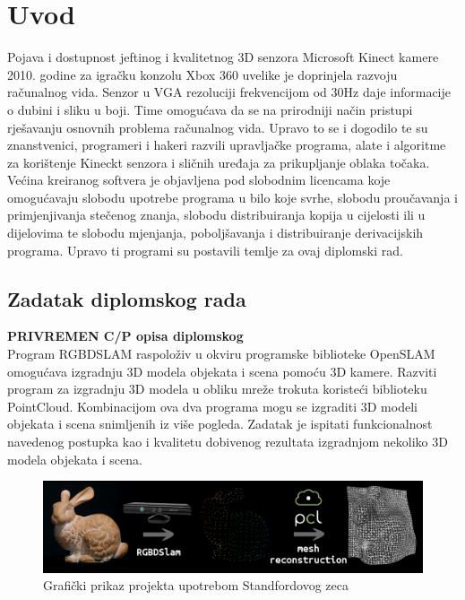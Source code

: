 \newpage

\setcounter{page}{1}
\setcounter{figure}{0}
\section{Uvod}%
\label{sec:Uvod}


Pojava i dostupnost jeftinog i kvalitetnog 3D senzora Microsoft Kinect
kamere 2010. godine za igračku konzolu Xbox 360 uvelike je doprinjela
razvoju računalnog vida. Senzor u VGA rezoluciji frekvencijom od 30Hz
daje informacije o dubini i sliku u boji. Time omogućava da se na
prirodniji način pristupi rješavanju osnovnih problema računalnog vida.
Upravo to se i dogodilo te su znanstvenici, programeri i hakeri 
razvili upravljačke programa, alate i algoritme za korištenje Kineckt
senzora i sličnih uređaja za prikupljanje oblaka točaka. Većina
kreiranog softvera je objavljena pod slobodnim licencama koje
omogućavaju slobodu upotrebe programa u bilo koje svrhe, slobodu
proučavanja i primjenjivanja stečenog znanja, slobodu distribuiranja
kopija u cijelosti ili u dijelovima te slobodu mjenjanja, poboljšavanja
i distribuiranje derivacijskih programa. Upravo ti programi su postavili
temlje za ovaj diplomski rad.




\newpage
\subsection{Zadatak diplomskog rada} %
\label{sub:Zadatak diplomskog rada}
\textbf{PRIVREMEN C/P opisa diplomskog} 
\\
Program RGBDSLAM raspoloživ u okviru programske biblioteke OpenSLAM
omogućava izgradnju 3D modela objekata i scena pomoću 3D kamere.
Razviti program za izgradnju 3D modela u obliku mreže trokuta koristeći
biblioteku PointCloud. Kombinacijom ova dva programa mogu se izgraditi
3D modeli objekata i scena snimljenih iz više pogleda. Zadatak je
ispitati funkcionalnost navedenog postupka kao i kvalitetu dobivenog
rezultata izgradnjom nekoliko 3D modela objekata i scena.

\begin{figure}[h]
\centering
\includegraphics[scale=0.35]{figures/project-description.jpeg}
\caption[]{Grafički prikaz projekta upotrebom Standfordovog
zeca\footnotemark[1]}
\label{fig:project-description}
\end{figure}


